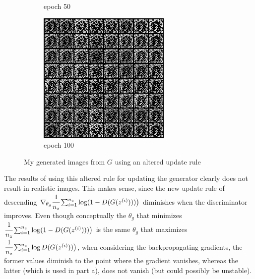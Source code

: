 \documentclass[a4paper]{article}
\theoremstyle{definition}
\newenvironment{soln}{
	\leavevmode\color{blue}\ignorespaces
}{}
\begin{document}
\begin{enumerate} [label=(\alph*)]
\begin{soln}
\begin{figure}[H]
\begin{subfigure}[b]{0.3\textwidth}
					\caption{epoch 50}
				\end{subfigure}
				\hfill
				\begin{subfigure}[b]{0.3\textwidth}
					\centering
					\includegraphics[width=\textwidth]{1b_e100.png}
					\caption{epoch 100}
				\end{subfigure}
				\caption{My generated images from $G$ using an altered update rule}
				\label{fig:three graphs}
			\end{figure}
			
			The results of using this altered rule for updating the generator clearly does not result in realistic images. This makes sense, since the new update rule of descending $\nabla_{\theta_{g}}  \cfrac{1}{n_{z}}  \sum_{i=1}^{n_{z}}\log (1-D(G(z^{(i)})))\big )$ diminishes when the discriminator improves. Even though conceptually the $\theta_{g}$ that minimizes $\cfrac{1}{n_{z}}  \sum_{i=1}^{n_{z}}\log (1-D(G(z^{(i)})))\big )$ is the same $\theta_{g}$ that maximizes $\cfrac{1}{n_{z}} \sum_{i=1}^{n_{z}}  \log D(G(z^{(i)}))\big )$, when considering the backpropagating gradients, the former values diminish to the point where the gradient vanishes, whereas the latter (which is used in part a), does not vanish (but could possibly be unstable).
			
		\end{soln}
		

\end{enumerate}
\end{document}
